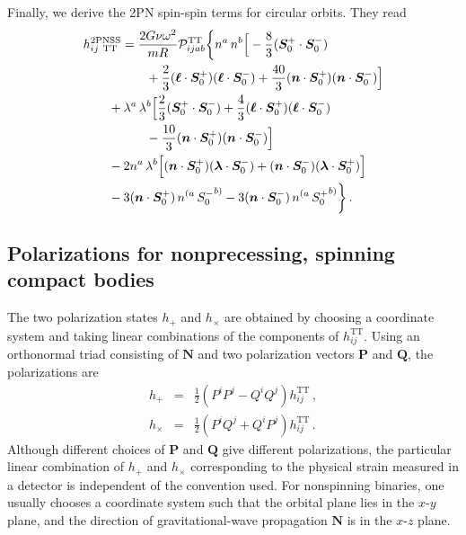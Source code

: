 \documentclass[aps, prd,
twocolumn,%
superscriptaddress,
showpacs, nofootinbib, eqsecnum, amsmath, amssymb, floatfix
]{revtex4}
\newcommand{\bmSeffp}{{\bm{S}_{0}^+}}
\newcommand{\bmSeffm}{{\bm{S}_{0}^-}}
\newcommand{\Seffp}{{S_{0}^+}}
\newcommand{\Seffm}{{S_{0}^-}}
\begin{document}
Finally, we derive the 2PN spin-spin terms for circular orbits. They read
%
\begin{align}
& h_{ij \ \mathrm{ TT}}^{\mathrm {2 PN SS}}= \frac{2G  \nu \omega^2}{m R} {\cal
  P}_{ijab}^{\mathrm{TT}} \bigg\{
n^a\, n^b
 \Big[-\frac{8}{3} ( \bmSeffp\cdot \bmSeffm)
\nonumber \\ & \qquad  \qquad \quad +
\frac{2}{3}
(\bm{\ell}\cdot \bmSeffp) (\bm{\ell}\cdot
\bmSeffm) +
\frac{40}{3} (\bm{n}\cdot \bmSeffp) (\bm{n}\cdot
\bmSeffm) \Big]\nonumber \\ & \qquad +
 \lambda^a \, \lambda^b
\Big[ \frac{2}{3} ( \bmSeffp\cdot \bmSeffm) + \frac{4}{3}
(\bm{\ell}\cdot \bmSeffp) (\bm{\ell}\cdot \bmSeffm)
\nonumber \\ & \qquad \qquad \quad -
\frac{10}{3} (\bm{n}\cdot \bmSeffp) (\bm{n}\cdot \bmSeffm) \Big]
\nonumber \\ & \qquad -2
n^a \, \lambda^b \Big[ (\bm{n}\cdot \bmSeffp) (\bm{\lambda}\cdot
\bmSeffm)+
(\bm{n}\cdot \bmSeffm) (\bm{\lambda}\cdot \bmSeffp)\Big]
\nonumber \\ & \qquad -3
(\bm{n}\cdot \bmSeffp)\,  n^{(a} \, \Seffm^{b)}
- 3 (\bm{n}\cdot \bmSeffm) \, n^{(a} \, \Seffp^{b)}
\bigg\} \, .
\end{align}
%

\subsection{Polarizations for nonprecessing, spinning compact bodies}
\label{sec:pol}

The two polarization states $h_+$ and $h_\times$ are obtained by choosing a
coordinate system and taking linear combinations of the components of
$h_{ij}^\mathrm{TT}$. Using an orthonormal triad consisting of $\bm{N}$ and two
polarization vectors $\bm{P}$ and $\bm{Q}$, the polarizations are
\begin{subequations}
 \label{eq:polarizations}
\begin{eqnarray}
h_+&=& \frac{1}{2}\left(P^iP^j-Q^iQ^j\right)h_{ij}^\mathrm{TT}\,,\\
h_\times&=&\frac{1}{2}\left(P^iQ^j+Q^iP^j\right)h_{ij}^\mathrm{TT}\, .
\end{eqnarray}
\end{subequations}
Although different choices of $\bm{P}$ and $\bm{Q}$ give different
polarizations, the particular linear combination of $h_+$ and
$h_\times$ corresponding to the physical strain measured in a
detector is independent of the convention used. For nonspinning
binaries, one usually chooses a coordinate system such that the
orbital plane lies in the $x\mbox{-}y$ plane, and the direction of
gravitational-wave propagation $\bm{N}$ is in the $x\mbox{-}z$
plane.
\end{document}

